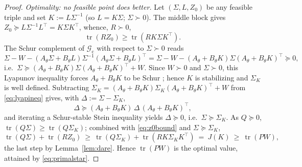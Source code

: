 \documentclass[11pt]{article}
\theoremstyle{definition}
\DeclareMathOperator{\tr}{tr}
\newcommand{\Th}{\theta}
\newcommand{\Sig}{\Sigma}
\begin{document}
\begin{proof}
\emph{Optimality: no feasible point does better.} Let $(\Sig,L,Z_0)$ be any
feasible triple and set $K:=L\Sig^{-1}$ (so $L=K\Sig$; $\Sig\succ0$). The middle
block gives $Z_0\succeq L\Sig^{-1}L^\top=K\Sig K^\top$, whence, $R\succ0$,
\begin{equation}\label{eq:z0bound}
\tr(RZ_0)\ge\tr(RK\Sig K^\top).
\end{equation}
The Schur complement of $\mathcal G_{\mathrm c}$ with respect to $\Sig\succ0$
reads
\begin{equation}\label{eq:lyapineq}
\Sig-W-(A_\Th\Sig+B_\Th L)\Sig^{-1}(A_\Th\Sig+B_\Th L)^\top
=\Sig-W-(A_\Th+B_\Th K)\Sig(A_\Th+B_\Th K)^\top\succeq0,
\end{equation}
i.e.\ $\Sig\succeq(A_\Th+B_\Th K)\Sig(A_\Th+B_\Th K)^\top+W$. Since $W\succ0$ and
$\Sig\succ0$, this Lyapunov inequality forces $A_\Th+B_\Th K$ to be Schur
\cite[Ch.~5]{BoydLMI}; hence $K$ is stabilizing and $\Sig_K$ is well defined.
Subtracting $\Sig_K=(A_\Th+B_\Th K)\Sig_K(A_\Th+B_\Th K)^\top+W$ from
\eqref{eq:lyapineq} gives, with $\Delta:=\Sig-\Sig_K$,
\begin{equation}\label{eq:deltastein}
\Delta\succeq (A_\Th+B_\Th K)\,\Delta\,(A_\Th+B_\Th K)^\top,
\end{equation}
and iterating a Schur-stable Stein inequality yields $\Delta\succeq0$, i.e.\
$\Sig\succeq\Sig_K$. As $Q\succeq0$, $\tr(Q\Sig)\ge\tr(Q\Sig_K)$; combined with
\eqref{eq:z0bound} and $\Sig\succeq\Sig_K$,
\[
\tr(Q\Sig)+\tr(RZ_0)\ \ge\ \tr(Q\Sig_K)+\tr(RK\Sig_KK^\top)\ =\ J(K)\ \ge\ \tr(PW),
\]
the last step by Lemma~\ref{lem:dare}. Hence $\tr(PW)$ is the optimal value,
attained by \eqref{eq:primalstar}.


\end{proof}
\end{document}
